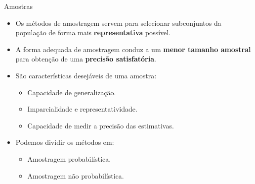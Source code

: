 \documentclass[
  ignorenonframetext,
  serif,
  professionalfont,
  usenames,
  dvipsnames,
  aspectratio = 169]{beamer}
\providecommand{\tightlist}{%
  \setlength{\itemsep}{0pt}\setlength{\parskip}{0pt}}
\renewcommand{\tightlist}{%
  \setlength{\itemsep}{0\baselineskip}
  \setlength{\parskip}{0.25\baselineskip}
}
\def\beginAHalfColumn{\begin{minipage}{0.49\textwidth}}%
\def\endColumns{\end{minipage}}%
\begin{document}
\begin{frame}{Amostras}
\label{amostras-1}
\beginAHalfColumn

\begin{itemize}
\tightlist
\item
  Os métodos de amostragem servem para selecionar subconjuntos da
  população de forma mais \textbf{representativa} possível.
\end{itemize}

\vspace{0.3cm}

\begin{itemize}
\tightlist
\item
  A forma adequada de amostragem conduz a um
  \textbf{menor tamanho amostral} para obtenção de uma
  \textbf{precisão satisfatória}.
\end{itemize}

\endColumns
\beginAHalfColumn

\begin{itemize}
\tightlist
\item
  São características desejáveis de uma amostra:

  \begin{itemize}
  \tightlist
  \item
    Capacidade de generalização.
  \item
    Imparcialidade e representatividade.
  \item
    Capacidade de medir a precisão das estimativas.
  \end{itemize}
\item
  Podemos dividir os métodos em:

  \begin{itemize}
  \tightlist
  \item
    Amostragem probabilística.
  \item
    Amostragem não probabilística.
  \end{itemize}
\end{itemize}

\endColumns
\end{frame}
\end{document}
